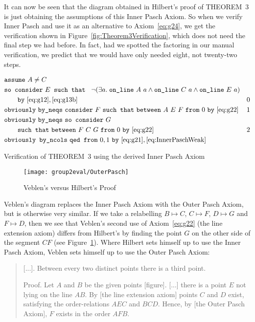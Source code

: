 It can now be seen that the diagram obtained in Hilbert's proof of THEOREM~3 is just obtaining the assumptions of this Inner Pasch Axiom. So when we verify Inner Pasch and use it as an alternative to Axiom~\ref{eq:g24}, we get the verification shown in Figure~\ref{fig:Theorem3Verification}, which does not need the final step we had before. In fact, had we spotted the factoring in our manual verification, we predict that we would have only needed eight, not twenty-two steps.

\begin{boxedfigure}
\begin{align*}
  &\code{assume}\ A\neq C\\
  &\code{so consider}\ E \code{ such that }\ \Triangle{a}{A}{C}{E}\\
  &\qquad\code{by}\ \eqref{eq:g12},\eqref{eq:g13b}& 0\\
  &\code{obviously}\ \code{by\_neqs}\ \code{consider}\ F\ \code{such that}\ \between{A}{E}{F}\ \code{from}\ 0\ \code{by}\ \eqref{eq:g22} & 1\\
  &\code{obviously}\ \code{by\_neqs}\ \code{so consider}\ G\\
  &\qquad\code{such that}\ \between{F}{C}{G}\ \code{from}\ 0\ \code{by}\ \eqref{eq:g22} & 2\\
  &\code{obviously by\_ncols}\ \code{qed from}\ 0,1\ \code{by}\ \eqref{eq:g21},\eqref{eq:InnerPaschWeak}
\end{align*}
\caption{Verification of THEOREM~3 using the derived Inner Pasch Axiom}
\label{fig:Theorem3Verification}
\end{boxedfigure}

\begin{figure}
\centering\texttt{[image: group2eval/OuterPasch]}
\caption{Veblen's versus Hilbert's Proof}
\label{fig:VeblenHilbert}
\end{figure}

Veblen's diagram replaces the Inner Pasch Axiom with the Outer Pasch Axiom, but is otherwise very similar. If we take a relabelling $B \mapsto C$, $C \mapsto F$, $D \mapsto G$ and $F \mapsto D$, then we see that Veblen's second use of Axiom~\ref{eq:g22} (the line extension axiom) differs from Hilbert's by finding the point $G$ on the other side of the segment $CF$ (see Figure~\ref{fig:VeblenHilbert}). Where Hilbert sets himself up to use the Inner Pasch Axiom, Veblen sets himself up to use the Outer Pasch Axiom:

\begin{quotation}\label{sec:VeblenThree}
[...]. Between every two distinct points there is a third point.

Proof. Let $A$ and $B$ be the given points [figure]. [...] there is a point $E$ not lying on the line $AB$. By [the line extension axiom] points $C$ and $D$ exist, satisfying the order-relations $AEC$ and $BCD$. Hence, by [the Outer Pasch Axiom], $F$ exists in the order $AFB$.
\vspace{0.5cm}
\end{quotation}

